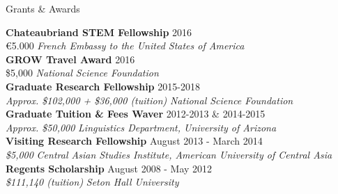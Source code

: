 \documentclass{resume} %
\begin{document}
\begin{minipage}{\textwidth}

\begin{rSection}{Grants \& Awards}
\vspace{.15cm}

{\bf Chateaubriand STEM Fellowship} \hfill {2016} \\ 
{\euro{5.000}} \hfill {\em French Embassy to the United States of America} \\


{\bf GROW Travel Award} \hfill {2016} \\ 
{\$5,000} \hfill {\em National Science Foundation} \\


{\bf Graduate Research Fellowship} \hfill {2015-2018} \\ 
{\em Approx. \$102,000 + \$36,000 (tuition)} \hfill {\em National Science Foundation} \\


{\bf Graduate Tuition \& Fees Waver} \hfill {2012-2013 \& 2014-2015} \\ 
{\em Approx. \$50,000} \hfill {\em Linguistics Department, University of Arizona} \\


{\bf Visiting Research Fellowship} \hfill {August 2013 - March 2014} \\ 
{\em \$5,000} \hfill {\em Central Asian Studies Institute, American University of Central Asia} \\


{\bf Regents Scholarship} \hfill {August 2008 - May 2012} \\ 
{\em \$111,140 (tuition)} \hfill {\em Seton Hall University} \\



\end{rSection}
\end{minipage}
\end{document}
